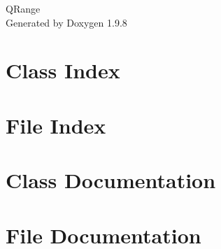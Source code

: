 \documentclass[twoside]{book}
\newcommand{\+}{\discretionary{\mbox{\scriptsize$\hookleftarrow$}}{}{}}
\newcommand{\clearemptydoublepage}{%
    \newpage{\pagestyle{empty}\cleardoublepage}%
  }
\begin{document}
  \raggedbottom
    \hypersetup{pageanchor=false,
                bookmarksnumbered=true,
                pdfencoding=unicode
               }
  \begin{titlepage}
  \vspace*{7cm}
  \begin{center}%
  {\Large QRange}\\
  \vspace*{1cm}
  {\large Generated by Doxygen 1.9.8}\\
  \end{center}
  \end{titlepage}
  \clearemptydoublepage
  \tableofcontents
  \clearemptydoublepage
  \hypersetup{pageanchor=true}
\chapter{Class Index}

\chapter{File Index}

\chapter{Class Documentation}



\chapter{File Documentation}

  \backmatter
  \newpage
  \clearemptydoublepage
  \printindex
\end{document}
